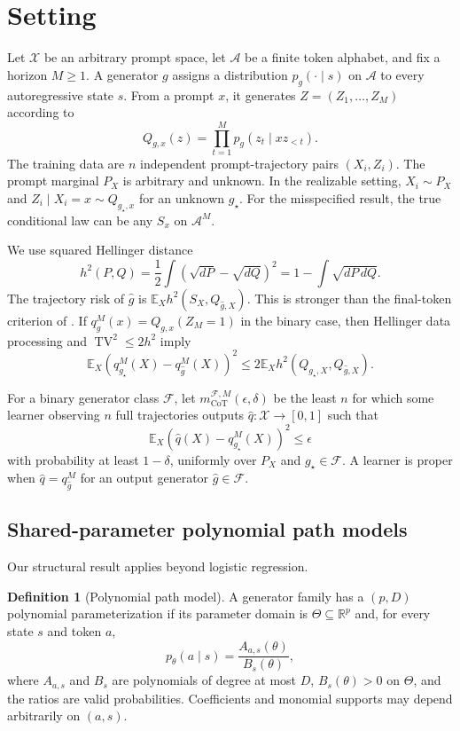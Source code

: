 \documentclass{article}
\theoremstyle{definition}
\newtheorem{definition}[theorem]{Definition}
\theoremstyle{remark}
\newcommand{\E}{\mathbb E}
\newcommand{\cA}{\mathcal A}
\newcommand{\cF}{\mathcal F}
\newcommand{\cX}{\mathcal X}
\newcommand{\TV}{\operatorname{TV}}
\begin{document}
\section{Setting}
\label{sec:setting}

Let $\cX$ be an arbitrary prompt space, let $\cA$ be a finite token alphabet, and fix a horizon $M\ge1$. A generator $g$ assigns a distribution $p_g(\cdot\mid s)$ on $\cA$ to every autoregressive state $s$. From a prompt $x$, it generates $Z=(Z_1,\ldots,Z_M)$ according to \[ Q_{g,x}(z)=\prod_{t=1}^M p_g(z_t\mid xz_{<t}). \] The training data are $n$ independent prompt-trajectory pairs $(X_i,Z_i)$. The prompt marginal $P_X$ is arbitrary and unknown. In the realizable setting, $X_i\sim P_X$ and $Z_i\mid X_i=x\sim Q_{g_\star,x}$ for an unknown $g_\star$. For the misspecified result, the true conditional law can be any $S_x$ on $\cA^M$.

We use squared Hellinger distance \[ h^2(P,Q)=\frac12\int(\sqrt{dP}-\sqrt{dQ})^2=1-\int\sqrt{dP\,dQ}. \] The trajectory risk of $\widehat g$ is $\E_X h^2(S_X,Q_{\widehat g,X})$. This is stronger than the final-token criterion of \citet{doronarad2026stochastic}. If $q_g^M(x)=Q_{g,x}(Z_M=1)$ in the binary case, then Hellinger data processing and $\TV^2\le2h^2$ imply
\begin{equation}
\label{eq:final-convert}
\E_X(q_{g_\star}^M(X)-q_{\widehat g}^M(X))^2
\le2\E_Xh^2(Q_{g_\star,X},Q_{\widehat g,X}).
\end{equation}

For a binary generator class $\cF$, let $m_{\mathrm{CoT}}^{\cF,M}(\epsilon,\delta)$ be the least $n$ for which some learner observing $n$ full trajectories outputs $\widehat q:\cX\to[0,1]$ such that \[ \E_X(\widehat q(X)-q_{g_\star}^M(X))^2\le\epsilon \] with probability at least $1-\delta$, uniformly over $P_X$ and $g_\star\in\cF$. A learner is proper when $\widehat q=q_{\widehat g}^M$ for an output generator $\widehat g\in\cF$.

\subsection{Shared-parameter polynomial path models}

Our structural result applies beyond logistic regression.

\begin{definition}[Polynomial path model]
\label{def:poly}
A generator family has a $(p,D)$ polynomial parameterization if its parameter domain is $\Theta\subseteq\mathbb R^p$ and, for every state $s$ and token $a$, \[ p_\theta(a\mid s)=\frac{A_{a,s}(\theta)}{B_s(\theta)}, \] where $A_{a,s}$ and $B_s$ are polynomials of degree at most $D$, $B_s(\theta)>0$ on $\Theta$, and the ratios are valid probabilities. Coefficients and monomial supports may depend arbitrarily on $(a,s)$.
\end{definition}
\end{document}
